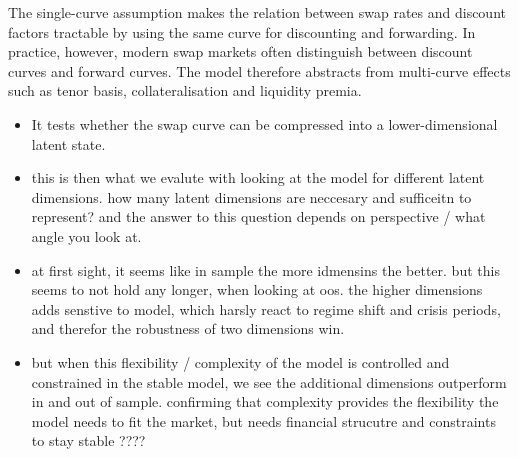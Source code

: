 The single-curve assumption makes the relation between swap rates and
discount factors tractable by using the same curve for discounting and
forwarding. In practice, however, modern swap markets often distinguish
between discount curves and forward curves. The model therefore abstracts from
multi-curve effects such as tenor basis, collateralisation and liquidity
premia.




\begin{itemize}
    \item It tests whether the swap curve can be compressed into a lower-dimensional latent state.
    \item this is then what we evalute with looking at the model for different latent dimensions. how many latent dimensions are neccesary and sufficeitn to represent? and the answer to this question depends on perspective / what angle you look at. 
    \item at first sight, it seems like in sample the more idmensins the better. but this seems to not hold any longer, when looking at oos. the higher dimensions adds senstive to model, which harsly react to regime shift and crisis periods, and therefor the robustness of two dimensions win. 
    \item but when this flexibility / complexity of the model is controlled and constrained in the stable model, we see the additional dimensions outperform in and out of sample. confirming that complexity  provides the flexibility the model needs to fit the market, but needs financial strucutre and constraints to stay stable ????
\end{itemize}